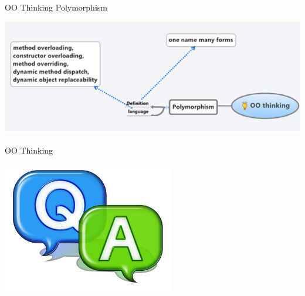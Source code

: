 \documentclass[14pt]{beamer}
\begin{document}
\begin{frame}{OO Thinking}
Polymorphism
\begin{center}
    \includegraphics[scale=0.5]{Image27.png}
\end{center}
\end{frame}
\begin{frame}{OO Thinking}

\begin{center}
    \includegraphics[scale=0.5]{Image29.png}
\end{center}
\end{frame}
\end{document}
